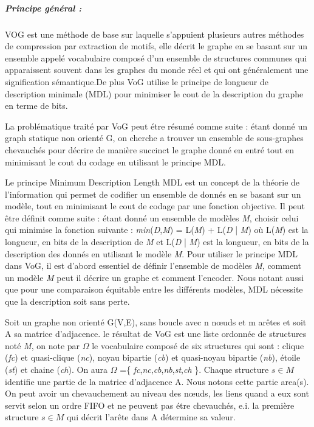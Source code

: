 
\subparagraph{Principe général :}

VOG est une méthode de base sur laquelle s'appuient plusieurs autres méthodes de compression par extraction de motifs, elle décrit le graphe en se basant sur un ensemble appelé vocabulaire composé d'un ensemble de structures communes  qui apparaissent souvent dans les graphes du monde réel et qui ont généralement une signification sémantique.De plus VoG utilise le principe de longueur de description minimale (MDL) pour minimiser le cout de la description du graphe en terme de bits.

La problématique traité par VoG peut étre résumé comme suite : étant donné un graph statique non orienté G, on cherche a trouver un ensemble de sous-graphes chevauchés pour décrire de manière succinct le graphe donné en entré tout en minimisant le cout du codage en utilisant le principe MDL.

Le principe  Minimum Description Length MDL  est un concept de la théorie de l'information qui permet de codifier un ensemble de donnés en se basant sur un modèle, tout en minimisant le cout de codage par une fonction objective. Il peut être définit comme suite : étant donné un ensemble de modèles \textit{M}, choisir celui qui minimise la fonction suivante : \textit{min}(\textit{D},\textit{M}) = L(\textit{M}) + L(\textit{D} | \textit{M}) où L(\textit{M}) est la longueur, en bits de la description de \textit{M} et L(\textit{D} | \textit{M}) est la longueur, en bits de la description des donnés en utilisant le modèle \textit{M}. Pour utiliser le principe MDL dans VoG, il est d'abord essentiel de définir l'ensemble de modèles \textit{M}, comment un modèle \textit{M} peut il décrire un graphe et comment l'encoder. Nous notant aussi que pour une comparaison équitable entre les différents modèles, MDL nécessite que la description soit sans perte.

Soit un graphe non orienté G(V,E), sans boucle avec n nœuds et m arêtes et soit A sa matrice d'adjacence. le résultat de VoG est une liste ordonnée de structures noté \textit{M}, on note par $\Omega$ le vocabulaire composé de six structures qui sont : clique (\textit{fc}) et quasi-clique (\textit{nc}), noyau bipartie (\textit{cb}) et quasi-noyau bipartie (\textit{nb}), étoile (\textit{st}) et chaine (\textit{ch}). On aura $\Omega$ =\{ \textit{fc},\textit{nc},\textit{cb},\textit{nb},\textit{st},\textit{ch} \}. Chaque structure $ s \in \textit{M} $ identifie une partie de la matrice d'adjacence A. Nous notons cette partie area(s). On peut avoir un chevauchement au niveau des nœuds, les liens quand a eux sont servit selon un ordre FIFO et ne peuvent pas étre chevauchés, e.i. la première structure $ s \in \textit{M} $ qui décrit l'arête dans A détermine sa valeur.

